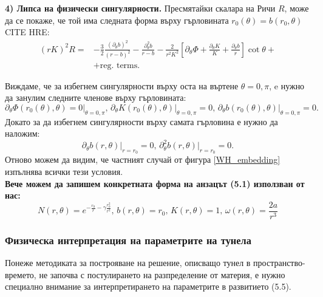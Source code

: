\textbf{4) Липса на физически сингулярности.} Пресмятайки скалара на Ричи $R$, може да се покаже, че той има следната форма върху гърловината $r_0(\theta) = b(r_0,\theta)$ CITE HRE:
\begin{equation}
	\begin{aligned}
		(rK)^2R = &-\frac{3}{2}\frac{(\partial_\theta b)^2}{(r - b)^2} - \frac{\partial^2_\theta b}{r - b}
	- \frac{2}{r^2K^2}\left[\partial_\theta \Phi + \frac{\partial_\theta K}{K} + \frac{\partial_\theta b}{r}\right]\cot\theta + \\ 
	& + \text{reg. terms}.
	\end{aligned}
\end{equation}

\lfoot{}

Виждаме, че за избегнем сингулярности върху оста на въртене $\theta = 0,\pi$, e нужно да занулим следните членове върху гърловината:
\begin{equation}
	\partial_\theta \Phi(r_0(\theta),\theta) = 0\big\vert_{\theta = 0,\pi},\, \partial_\theta K(r_0(\theta),\theta)\big\vert_{\theta = 0,\pi} = 0,\,\partial_\theta b(r_0(\theta),\theta)\big\vert_{\theta = 0,\pi} = 0.
\end{equation}
Докато за да избегнем сингулярности върху самата гърловина е нужно да наложим:
\begin{equation}
	\partial_\theta b(r,\theta)\big\vert_{r = r_0} = 0,\, \partial^2_\theta b(r,\theta)\big\vert_{r = r_0} = 0.
\end{equation}
Отново можем да видим, че частният случай от фигура \ref{WH_embedding} изпълнява всички тези условия.\\
\lfoot{}
\textbf{Вече можем да запишем конкретната форма на анзацът (5.1) използван от нас:}
\begin{equation}
	N(r,\theta) = e^{-\frac{r_0}{r} - \gamma\frac{r_0^2}{r^2}},\, b(r,\theta) = r_0,\, K(r,\theta) = 1,\, \omega(r,\theta) = \frac{2a}{r^3}
\end{equation}


\subsubsection{Физическа интерпретация на параметрите на тунела}

Понеже методиката за построяване на решение, описващо тунел в пространство-времето, не започва с постулирането на разпределение от материя, е нужно специално внимание за интерпретирането на параметрите в развитието (5.5).\\

